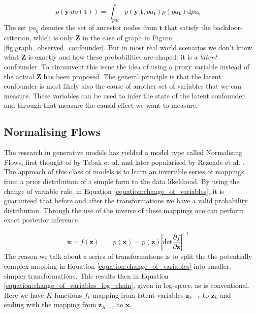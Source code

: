 \documentclass{article}
\newcommand{\bt}{\mathbf{t}}
\newcommand{\bx}{\mathbf{x}}
\newcommand{\by}{\mathbf{y}}
\newcommand{\bZ}{\mathbf{Z}}
\newcommand{\bz}{\mathbf{z}}
\newcommand{\parfrac}[2]{\frac{\partial #1}{\partial#2}}
\begin{document}
\begin{equation}\label{equation:do_operation}
   p(\by | do(\bt)) = \int_{pa_\bt} p(\by | \bt, pa_{\bt}) p(pa_{\bt}) \text{d} pa_\bt
\end{equation}
The set $\text{pa}_\bt$ denotes the set of ancestor nodes from $\bt$ that satisfy the backdoor-criterion\footnotemark[\ref{note:citation}], which is only $\bZ$ in the case of graph in Figure \ref{fig:graph_observed_confounder}. But in most real world scenarios we don't know what $\bZ$ is exactly and how these probabilities are shaped: it is a \textit{latent} confounder\footnotemark[\ref{note:citation}]. To circumvent this issue the idea of using a proxy variable instead of the actual $\bZ$ has been proposed\footnotemark[\ref{note:citation}]. The general principle is that the latent confounder is most likely also the cause of another set of variables that we can measure. These variables can be used to infer the state of the latent confounder and through that measure the causal effect we want to measure.

\subsection{Normalising Flows}
The research in generative models has yielded a model type called Normalising Flows, first thought of by Tabak et al. \cite{tabak2013family} and later popularised by Rezende et al. \cite{rezende2016variational}. The approach of this class of models is to learn an invertible series of mappings from a prior distribution of a simple form to the data likelihood. By using the change of variable rule, in Equation \ref{equation:change_of_variables}, it is guaranteed that before and after the transformations we have a valid probability distribution. Through the use of the inverse of these mappings one can perform exact posterior inference. 

\begin{equation}\label{equation:change_of_variables}
    \bx = f(\bz) \qquad p(\bx) = p(\bz) \left|\text{det} \parfrac{f}{\bz} \right|^{-1}
\end{equation}
The reason we talk about a series of transformations is to split the the potentially complex mapping in Equation \ref{equation:change_of_variables} into smaller, simpler transformations. This results then in Equation \ref{equation:change_of_variables_log_chain}, given in log-space, as is conventional. Here we have $K$ functions $f_k$ mapping from latent variables $\bz_{k-1}$ to $\bz_k$ and ending with the mapping from $\bz_{K-1}$ to $\bx$.
\end{document}
